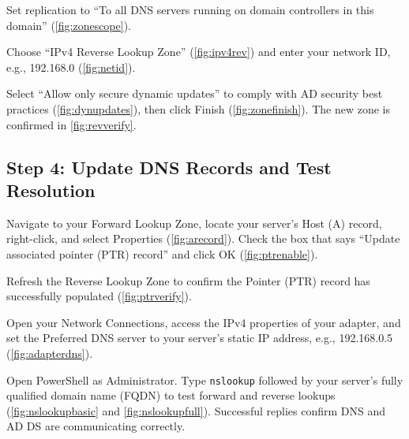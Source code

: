 
Set replication to ``To all DNS servers running on domain controllers in this domain'' (\autoref{fig:zonescope}).


Choose ``IPv4 Reverse Lookup Zone'' (\autoref{fig:ipv4rev}) and enter your network ID, e.g., 192.168.0 (\autoref{fig:netid}).


Select ``Allow only secure dynamic updates'' to comply with AD security best practices (\autoref{fig:dynupdates}), then click Finish (\autoref{fig:zonefinish}). The new zone is confirmed in \autoref{fig:revverify}.


\subsection{Step 4: Update DNS Records and Test Resolution}
\label{sec:step4}
Navigate to your Forward Lookup Zone, locate your server's Host (A) record, right-click, and select Properties (\autoref{fig:arecord}). Check the box that says ``Update associated pointer (PTR) record'' and click OK (\autoref{fig:ptrenable}).


Refresh the Reverse Lookup Zone to confirm the Pointer (PTR) record has successfully populated (\autoref{fig:ptrverify}).


Open your Network Connections, access the IPv4 properties of your adapter, and set the Preferred DNS server to your server's static IP address, e.g., 192.168.0.5 (\autoref{fig:adapterdns}).


Open PowerShell as Administrator. Type \texttt{nslookup} followed by your server's fully qualified domain name (FQDN) to test forward and reverse lookups (\autoref{fig:nslookupbasic} and \autoref{fig:nslookupfull}). Successful replies confirm DNS and AD DS are communicating correctly.


